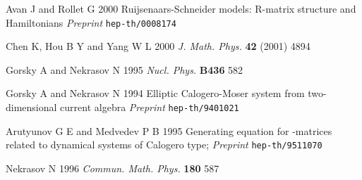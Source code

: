 \documentclass[a4paper,12pt]{article}
\begin{document}
\begin{thebibliography}{99}
  Avan J and Rollet G 2000 \coordHE{} Ruijsenaars-Schneider
models: R-matrix structure and Hamiltonians \textit{Preprint}
\texttt{hep-th/0008174}

  Chen K, Hou B Y and Yang W L 2000 \textit{J. Math. Phys.}
\textbf{42} (2001) 4894



  Gorsky A and Nekrasov N 1995 \textit{Nucl. Phys.} \textbf{B436}
582

 Gorsky A and Nekrasov N 1994 Elliptic Calogero-Moser
system from two-dimensional current algebra \textit{Preprint}
 \texttt{hep-th/9401021}

 Arutyunov G E and Medvedev P B 1995
Generating equation for \coordHE{}-matrices related to dynamical
systems of Calogero type; \textit{Preprint}
\texttt{hep-th/9511070}

  Nekrasov N 1996 \textit{Commun. Math. Phys.} \textbf{180}
587

\end{thebibliography}
\end{document}
